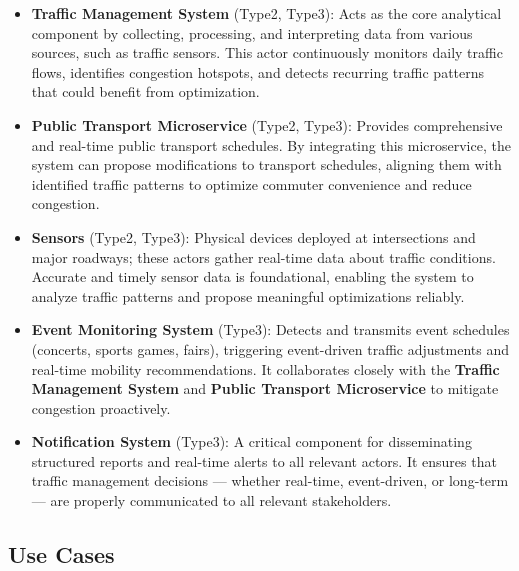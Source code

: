 \documentclass[a4paper,12pt]{article}
\begin{document}
\begin{itemize}
    \item \textbf{Traffic Management System} (Type2, Type3): Acts as the core analytical component by collecting, processing, and interpreting data from various sources, such as traffic sensors. This actor continuously monitors daily traffic flows, identifies congestion hotspots, and detects recurring traffic patterns that could benefit from optimization.
    \item \textbf{Public Transport Microservice} (Type2, Type3): Provides comprehensive and real-time public transport schedules. By integrating this microservice, the system can propose modifications to transport schedules, aligning them with identified traffic patterns to optimize commuter convenience and reduce congestion.
    \item \textbf{Sensors} (Type2, Type3): Physical devices deployed at intersections and major roadways; these actors gather real-time data about traffic conditions. Accurate and timely sensor data is foundational, enabling the system to analyze traffic patterns and propose meaningful optimizations reliably.
    \item \textbf{Event Monitoring System} (Type3): Detects and transmits event schedules (concerts, sports games, fairs), triggering event-driven traffic adjustments and real-time mobility recommendations. It collaborates closely with the \textbf{Traffic Management System} and \textbf{Public Transport Microservice} to mitigate congestion proactively.
    \item \textbf{Notification System} (Type3): A critical component for disseminating structured reports and real-time alerts to all relevant actors. It ensures that traffic management decisions — whether real-time, event-driven, or long-term — are properly communicated to all relevant stakeholders.
\end{itemize}

\newpage

\subsection{Use Cases}
\end{document}
